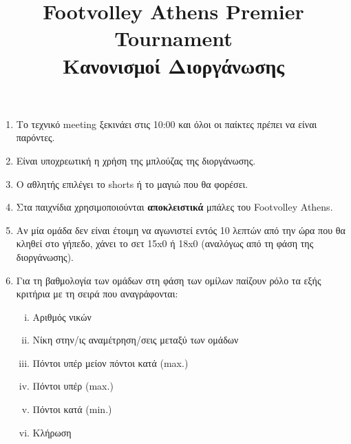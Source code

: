 \documentclass[a4paper,11pt]{article}
\title{Footvolley Athens Premier Tournament \\ Κανονισμοί Διοργάνωσης}
\date{}
\begin{document}
\maketitle
\thispagestyle{fancy}

\vspace{-3cm}

\begin{enumerate}

\item Το τεχνικό meeting ξεκινάει στις 10:00 και όλοι οι παίκτες πρέπει να είναι
  παρόντες.

\item Είναι υποχρεωτική η χρήση της μπλούζας της διοργάνωσης.

\item Ο αθλητής επιλέγει το shorts ή το μαγιώ που θα φορέσει.

\item Στα παιχνίδια χρησιμοποιούνται \textbf{αποκλειστικά} μπάλες του Footvolley
  Athens.

\item Αν μία ομάδα δεν είναι έτοιμη να αγωνιστεί εντός 10 λεπτών από την ώρα που
  θα κληθεί στο γήπεδο, χάνει το σετ 15x0 ή 18x0 (αναλόγως από τη φάση της
  διοργάνωσης).




\item Για τη βαθμολογία των ομάδων στη φάση των ομίλων παίζουν ρόλο τα εξής
  κριτήρια με τη σειρά που αναγράφονται:

  \begin{enumerate}[i)]
  \item Αριθμός νικών
  \item Νίκη στην/ις αναμέτρηση/σεις μεταξύ των ομάδων
  \item Πόντοι υπέρ μείον πόντοι κατά (max.)
  \item Πόντοι υπέρ (max.)
  \item Πόντοι κατά (min.)
  \item Κλήρωση %
  \end{enumerate}


\end{enumerate}
\end{document}
